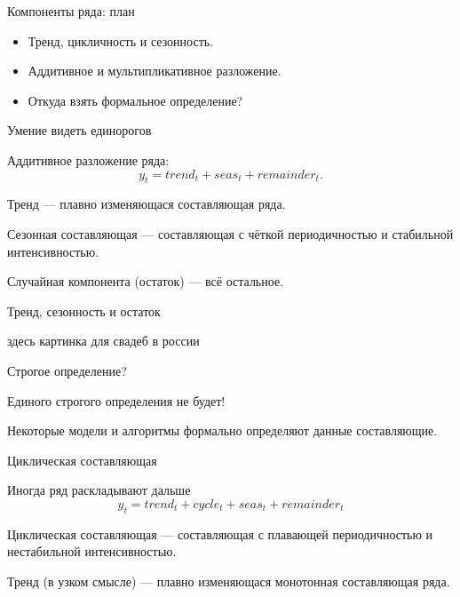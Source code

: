 
\begin{frame} %


\end{frame}



\begin{frame}{Компоненты ряда: план}
  \begin{itemize}[<+->]
    \item Тренд, цикличность и сезонность.
    \item Аддитивное и мультипликативное разложение.
    \item Откуда взять формальное определение?
  \end{itemize}

\end{frame}


\begin{frame}{Умение видеть единорогов}

Аддитивное разложение ряда:
\[
y_t = trend_t + seas_t + remainder_t.
\]

\pause

\alert{Тренд} — плавно изменяющася составляющая ряда.

\pause

\alert{Сезонная составляющая} — составляющая с чёткой периодичностью и стабильной интенсивностью.

\pause

\alert{Случайная компонента} (остаток) — всё остальное. 

\end{frame}

\begin{frame}{Тренд, сезонность и остаток}

здесь картинка для свадеб в россии 

\end{frame}

\begin{frame}{Строгое определение?}

\pause
Единого строгого определения \alert{не} будет!

\pause
Некоторые модели и алгоритмы формально \alert{определяют} данные составляющие.

\end{frame}

\begin{frame}{Циклическая составляющая}

Иногда ряд раскладывают дальше
\[
y_t = trend_t + cycle_t + seas_t + remainder_t
\]

\pause
\alert{Циклическая составляющая} — составляющая с плавающей периодичностью и нестабильной интенсивностью. 


\pause
\alert{Тренд} (в узком смысле) —  плавно изменяющася монотонная составляющая ряда.

\end{frame}


